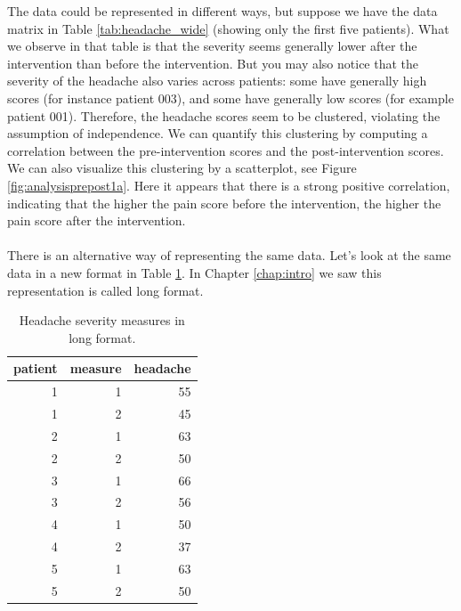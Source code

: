\documentclass[]{book}\usepackage[]{graphicx}\usepackage[]{color}
\begin{document}
The data could be represented in different ways, but suppose we have the data matrix in Table \ref{tab:headache_wide} (showing only the first five patients). What we observe in that table is that the severity seems generally lower after the intervention than before the intervention. But you may also notice that the severity of the headache also varies across patients: some have generally high scores (for instance patient 003), and some have generally low scores (for example patient 001). Therefore, the headache scores seem to be clustered, violating the assumption of independence. We can quantify this clustering by computing a correlation between the pre-intervention scores and the post-intervention scores. We can also visualize this clustering by a scatterplot, see Figure \ref{fig:analysisprepost1a}. Here it appears that there is a strong positive correlation, indicating that the higher the pain score before the intervention, the higher the pain score after the intervention. 
\\
\\

There is an alternative way of representing the same data. Let's look at the same data in a new format in Table \ref{tab:analysisprepost1}. In Chapter \ref{chap:intro} we saw this representation is called long format.

\begin{table}[ht]
\centering
\caption{Headache severity measures in long format.} 
\label{tab:analysisprepost1}
\begin{tabular}{rrr}
  \hline
patient & measure & headache \\ 
  \hline
1 & 1 & 55 \\ 
  1 & 2 & 45 \\ 
  2 & 1 & 63 \\ 
  2 & 2 & 50 \\ 
  3 & 1 & 66 \\ 
  3 & 2 & 56 \\ 
  4 & 1 & 50 \\ 
  4 & 2 & 37 \\ 
  5 & 1 & 63 \\ 
  5 & 2 & 50 \\ 
   \hline
\end{tabular}
\end{table}
\end{document}
